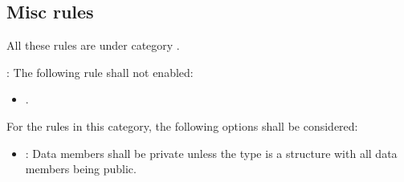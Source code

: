 \subsection{Misc rules}

All these rules are under category
.

: The following rule shall not enabled:
\begin{itemize}

\item {}.

\end{itemize}

For the rules in this category, the following options shall be considered:

\begin{itemize}

\item {}:
Data members shall be private unless the type is a structure with
all data members being public.

\end{itemize}
